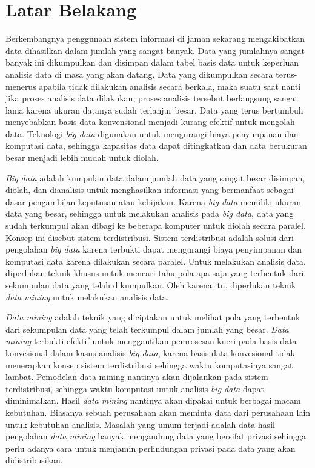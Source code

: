 \documentclass[a4paper,twoside]{article}
\begin{document}
\section{Latar Belakang}
Berkembangnya penggunaan sistem informasi di jaman sekarang mengakibatkan data dihasilkan dalam jumlah yang sangat banyak. Data yang jumlahnya sangat banyak ini dikumpulkan dan disimpan dalam tabel basis data untuk keperluan analisis data di masa yang akan datang. Data yang dikumpulkan secara terus-menerus apabila tidak dilakukan analisis secara berkala, maka suatu saat nanti jika proses analisis data dilakukan, proses analisis tersebut berlangsung sangat lama karena ukuran datanya sudah terlanjur besar. Data yang terus bertumbuh menyebabkan basis data konvensional menjadi kurang efektif untuk mengolah data. Teknologi \textit{big data} digunakan untuk mengurangi biaya penyimpanan dan komputasi data, sehingga kapasitas data dapat ditingkatkan dan data berukuran besar menjadi lebih mudah untuk diolah.

{\it Big data} adalah kumpulan data dalam jumlah data yang sangat besar disimpan, diolah, dan dianalisis untuk menghasilkan informasi yang bermanfaat sebagai dasar pengambilan keputusan atau kebijakan. Karena \textit{big data} memiliki ukuran data yang besar, sehingga untuk melakukan analisis pada \textit{big data}, data yang sudah terkumpul akan dibagi ke beberapa komputer untuk diolah secara paralel. Konsep ini disebut sistem terdistribusi. Sistem terdistribusi adalah solusi dari pengolahan \textit{big data} karena terbukti dapat mengurangi biaya penyimpanan dan komputasi data karena dilakukan secara paralel. Untuk melakukan analisis data, diperlukan teknik khusus untuk mencari tahu pola apa saja yang terbentuk dari sekumpulan data yang telah dikumpulkan. Oleh karena itu, diperlukan teknik \textit{data mining} untuk melakukan analisis data.


{\it Data mining} adalah teknik yang diciptakan untuk melihat pola yang terbentuk dari sekumpulan data yang telah terkumpul dalam jumlah yang besar. {\it Data mining} terbukti efektif untuk menggantikan pemrosesan kueri pada basis data konvesional dalam kasus analisis \textit{big data}, karena basis data konvesional tidak menerapkan konsep sistem terdistribusi sehingga waktu komputasinya sangat lambat. Pemodelan data mining nantinya akan dijalankan pada sistem terdistribusi, sehingga waktu komputasi untuk analisis \textit{big data} dapat diminimalkan. Hasil \textit{data mining} nantinya akan dipakai untuk berbagai macam kebutuhan. Biasanya sebuah perusahaan akan meminta data dari perusahaan lain untuk kebutuhan analisis. Masalah yang umum terjadi adalah data hasil pengolahan \textit{data mining} banyak mengandung data yang bersifat privasi sehingga perlu adanya cara untuk menjamin perlindungan privasi pada data yang akan didistribusikan.
\end{document}
